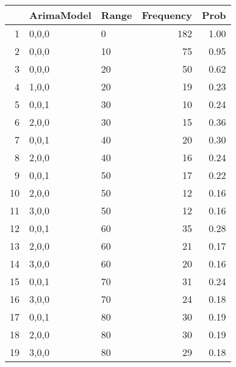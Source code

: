 \begin{table}[ht]
\centering
\begin{tabular}{rllrr}
  \hline
 & ArimaModel & Range & Frequency & Prob \\ 
  \hline
1 & 0,0,0 & 0 & 182 & 1.00 \\ 
  2 & 0,0,0 & 10 &  75 & 0.95 \\ 
  3 & 0,0,0 & 20 &  50 & 0.62 \\ 
  4 & 1,0,0 & 20 &  19 & 0.23 \\ 
  5 & 0,0,1 & 30 &  10 & 0.24 \\ 
  6 & 2,0,0 & 30 &  15 & 0.36 \\ 
  7 & 0,0,1 & 40 &  20 & 0.30 \\ 
  8 & 2,0,0 & 40 &  16 & 0.24 \\ 
  9 & 0,0,1 & 50 &  17 & 0.22 \\ 
  10 & 2,0,0 & 50 &  12 & 0.16 \\ 
  11 & 3,0,0 & 50 &  12 & 0.16 \\ 
  12 & 0,0,1 & 60 &  35 & 0.28 \\ 
  13 & 2,0,0 & 60 &  21 & 0.17 \\ 
  14 & 3,0,0 & 60 &  20 & 0.16 \\ 
  15 & 0,0,1 & 70 &  31 & 0.24 \\ 
  16 & 3,0,0 & 70 &  24 & 0.18 \\ 
  17 & 0,0,1 & 80 &  30 & 0.19 \\ 
  18 & 2,0,0 & 80 &  30 & 0.19 \\ 
  19 & 3,0,0 & 80 &  29 & 0.18 \\ 
   \hline
\end{tabular}
\end{table}
